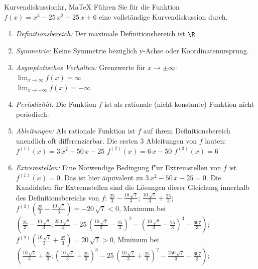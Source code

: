  \providecommand{\MoIl}{(} 
 \providecommand{\MoIr}{)}
 \providecommand{\MIntvlSep}{;} 
 \providecommand{\MElSetSep}{;} 
 \begin{MAufgabe}{Kurvendiskussion}{kr, MaTeX}
 F\"uhren Sie f\"ur die Funktion $f(x)=x^3 - 25\, x^2 - 25\, x + 6$ eine vollst\"andige Kurvendiskussion durch.\\ 
 \ifLsg\Loesung
 \begin{enumerate}
 \item \emph{Definitionsbereich:} 
 Der maximale Definitionsbereich ist $\R$\item \emph{Symmetrie:} 
 Keine Symmetrie bez\"uglich y-Achse oder Koordinatenursprung.\item \emph{Asymptotisches Verhalten:} 
 Grenzwerte f\"ur $x\rightarrow \pm \infty$: \\ 
 $\lim_{x\rightarrow \infty} f(x)=\infty$ \\ 
 $\lim_{x\rightarrow -\infty} f(x)=- \infty$ \\ 
 \item \emph{Periodizit\"at:} 
 Die Funktion $f$ ist als rationale (nicht konstante) Funktion nicht periodisch.\item \emph{Ableitungen:} 
 Als rationale Funktion ist $f$ auf ihrem Definitionsbereich unendlich oft differenzierbar. 
 Die ersten 3 Ableitungen von $f$ lauten: \\ 
 $f^{(1)}(x)=3\, x^2 - 50\, x - 25$\newline 
  $f^{(2)}(x)=6\, x - 50$\newline 
  $f^{(3)}(x)=6$\newline 
  \item \emph{Extremstellen:} 
 Eine Notwendige Bedingung f"ur Extremstellen von $f$ ist $f^{(1)}(x)=0$. 
 Das ist hier \"aquivalent zu $3\, x^2 - 50\, x - 25=0$. 
 Die Kandidaten f\"ur Extremstellen sind die L\"osungen dieser Gleichung innerhalb des Definitionsbereichs von $f$: $\frac{25}{3} - \frac{10\, \sqrt{7}}{3}$; $\frac{10\, \sqrt{7}}{3} + \frac{25}{3}$; \\ 
 $f^{(2)}(\frac{25}{3} - \frac{10\, \sqrt{7}}{3})=- 20\, \sqrt{7}$$<0$, Maximum bei $(\frac{25}{3} - \frac{10\, \sqrt{7}}{3};\frac{250\, \sqrt{7}}{3} - 25\, {\left(\frac{10\, \sqrt{7}}{3} - \frac{25}{3}\right)}^2 - {\left(\frac{10\, \sqrt{7}}{3} - \frac{25}{3}\right)}^3 - \frac{607}{3})$; \\ 
 $f^{(2)}(\frac{10\, \sqrt{7}}{3} + \frac{25}{3})=20\, \sqrt{7}$$>0$, Minimum bei $(\frac{10\, \sqrt{7}}{3} + \frac{25}{3};{\left(\frac{10\, \sqrt{7}}{3} + \frac{25}{3}\right)}^3 - 25\, {\left(\frac{10\, \sqrt{7}}{3} + \frac{25}{3}\right)}^2 - \frac{250\, \sqrt{7}}{3} - \frac{607}{3})$; \\ 

\end{enumerate}
\end{MAufgabe}
